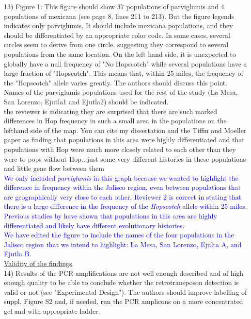\documentclass[11pt]{article}
\newcommand{\res}[1]{\noindent \textcolor{blue}{{#1}} \\}
\newcommand{\mbh}[1]{\noindent \textcolor{Dandelion}{{#1}}\\}
\begin{document}
13) Figure 1: This figure should show 37 populations of parviglumis and 4 populations of mexicana (see page 8, lines 211 to 213). But the figure legends indicates only parviglumis. It should include mexicana populations, and they should be differentiated by an appropriate color code. In some cases, several circles seem to derive from one circle, suggesting they correspond to several populations from the same location. On the left hand side, it is unexpected to globally have a null frequency of "No Hopscotch" while several populations have a large fraction of "Hopscotch". This means that, within 25 miles, the frequency of the "Hopscotch" allele varies greatly. The authors should discuss this point. Names of the parviglumis populations used for the rest of the study (La Mesa, San Lorenzo, Ejutla1 and Ejutla2) should be indicated.\\

\mbh{the reviewer is indicating they are surprised that there are such marked differences in Hop frequency in such a small area in the populations on the lefthand side of the map.  You can cite my dissertation and the Tiffin and Moeller paper as finding that populations in this area were highly differentiated and that populations with Hop were much more closely related to each other than they were to pops without Hop...just some very different histories in these populations and little gene flow between them}

\res{We only included \emph{parviglumis} in this graph because we wanted to highlight the difference in frequency within the Jalisco region, even between populations that are geographically very close to each other. Reviewer 2 is correct in stating that there is a large difference in the frequency of the \emph{Hopscotch} allele within 25 miles. Previous studies by \citet{Hufford2010; Moeller01072007} have shown that populations in this area are highly differentiated and likely have different evolutionary histories.}

\res{We have edited the figure to include the names of the four populations in the Jalisco region that we intend to highlight: La Mesa, San Lorenzo, Ejulta A, and Ejutla B.}


\underline{Validity of the findings}\\

14) Results of the PCR amplifications are not well enough described and of high enough quality to be able to conclude whether the retrotransposon detection is valid or not (see "Experimental Design"). The authors should improve labelling of suppl. Figure S2 and, if needed, run the PCR amplicons on a more concentrated gel and with appropriate ladder.\\
\end{document}
